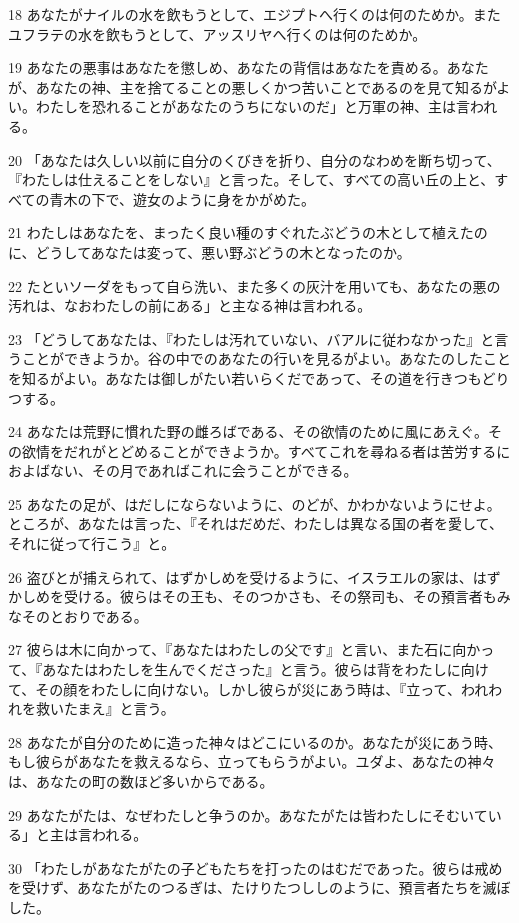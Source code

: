 \par 18 あなたがナイルの水を飲もうとして、エジプトへ行くのは何のためか。またユフラテの水を飲もうとして、アッスリヤへ行くのは何のためか。
\par 19 あなたの悪事はあなたを懲しめ、あなたの背信はあなたを責める。あなたが、あなたの神、主を捨てることの悪しくかつ苦いことであるのを見て知るがよい。わたしを恐れることがあなたのうちにないのだ」と万軍の神、主は言われる。
\par 20 「あなたは久しい以前に自分のくびきを折り、自分のなわめを断ち切って、『わたしは仕えることをしない』と言った。そして、すべての高い丘の上と、すべての青木の下で、遊女のように身をかがめた。
\par 21 わたしはあなたを、まったく良い種のすぐれたぶどうの木として植えたのに、どうしてあなたは変って、悪い野ぶどうの木となったのか。
\par 22 たといソーダをもって自ら洗い、また多くの灰汁を用いても、あなたの悪の汚れは、なおわたしの前にある」と主なる神は言われる。
\par 23 「どうしてあなたは、『わたしは汚れていない、バアルに従わなかった』と言うことができようか。谷の中でのあなたの行いを見るがよい。あなたのしたことを知るがよい。あなたは御しがたい若いらくだであって、その道を行きつもどりつする。
\par 24 あなたは荒野に慣れた野の雌ろばである、その欲情のために風にあえぐ。その欲情をだれがとどめることができようか。すべてこれを尋ねる者は苦労するにおよばない、その月であればこれに会うことができる。
\par 25 あなたの足が、はだしにならないように、のどが、かわかないようにせよ。ところが、あなたは言った、『それはだめだ、わたしは異なる国の者を愛して、それに従って行こう』と。
\par 26 盗びとが捕えられて、はずかしめを受けるように、イスラエルの家は、はずかしめを受ける。彼らはその王も、そのつかさも、その祭司も、その預言者もみなそのとおりである。
\par 27 彼らは木に向かって、『あなたはわたしの父です』と言い、また石に向かって、『あなたはわたしを生んでくださった』と言う。彼らは背をわたしに向けて、その顔をわたしに向けない。しかし彼らが災にあう時は、『立って、われわれを救いたまえ』と言う。
\par 28 あなたが自分のために造った神々はどこにいるのか。あなたが災にあう時、もし彼らがあなたを救えるなら、立ってもらうがよい。ユダよ、あなたの神々は、あなたの町の数ほど多いからである。
\par 29 あなたがたは、なぜわたしと争うのか。あなたがたは皆わたしにそむいている」と主は言われる。
\par 30 「わたしがあなたがたの子どもたちを打ったのはむだであった。彼らは戒めを受けず、あなたがたのつるぎは、たけりたつししのように、預言者たちを滅ぼした。
